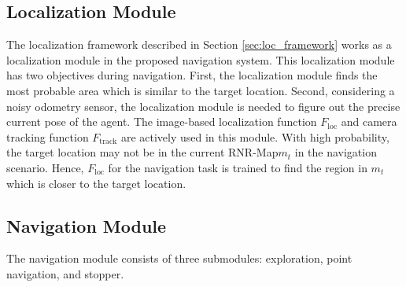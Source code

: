 \documentclass[10pt,twocolumn,letterpaper]{article}
\def\proposed{RNR-Map\xspace}
\begin{document}
\subsection{Localization Module}
The localization framework described in Section \ref{sec:loc_framework} works as a localization module in the proposed navigation system.
%
This localization module has two objectives during navigation.
%
First, the localization module finds the most probable area which is similar to the target location.
%
Second, considering a noisy odometry sensor, the localization module is needed to figure out the precise current pose of the agent.
%
The image-based localization function $F_\mathrm{loc}$ and camera tracking function $F_\mathrm{track}$ are actively used in this module.
%
With high probability, the target location may not be in the current \proposed $m_t$ in the navigation scenario.
%
Hence, $F_\mathrm{loc}$ for the navigation task is trained to find the region in $m_t$ which is closer to the target location. 

\subsection{Navigation Module}
%
The navigation module consists of three submodules: exploration, point navigation, and stopper.
%
\vspace{-0.4cm}
\end{document}
